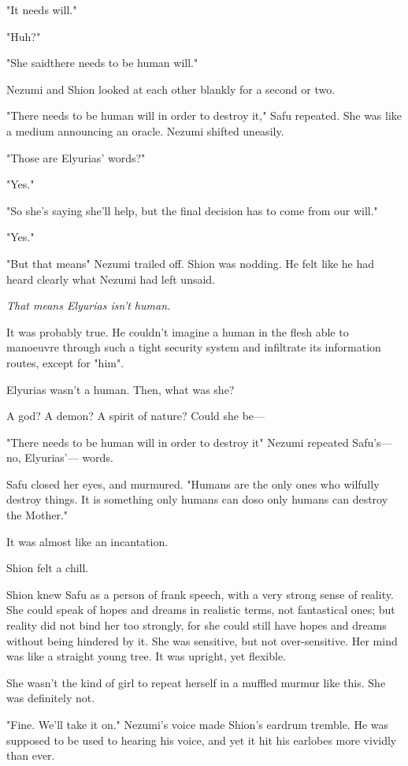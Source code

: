 "It needs will."

"Huh?"

"She said\el there needs to be human will."

Nezumi and Shion looked at each other blankly for a second or two.

"There needs to be human will in order to destroy it," Safu repeated.
She was like a medium announcing an oracle. Nezumi shifted uneasily.

"Those are Elyurias' words?"

"Yes."

"So she's saying she'll help, but the final decision has to come from
our will."

"Yes."

"But that means\el " Nezumi trailed off. Shion was nodding. He felt like
he had heard clearly what Nezumi had left unsaid.

\emph{That means Elyurias isn't human.}

It was probably true. He couldn't imagine a human in the flesh able to
manoeuvre through such a tight security system and infiltrate its
information routes, except for "him".

Elyurias wasn't a human. Then, what was she?

A god? A demon? A spirit of nature? Could she be---

"There needs to be human will in order to destroy it\el " Nezumi repeated
Safu's---no, Elyurias'--- words.

Safu closed her eyes, and murmured. "Humans are the only ones who
wilfully destroy things. It is something only humans can do\el so only
humans can destroy the Mother."

It was almost like an incantation.

Shion felt a chill.

Shion knew Safu as a person of frank speech, with a very strong sense of
reality. She could speak of hopes and dreams in realistic terms, not
fantastical ones; but reality did not bind her too strongly, for she
could still have hopes and dreams without being hindered by it. She was
sensitive, but not over-sensitive. Her mind was like a straight young
tree. It was upright, yet flexible.

She wasn't the kind of girl to repeat herself in a muffled murmur like
this. She was definitely not.

"Fine. We'll take it on." Nezumi's voice made Shion's eardrum tremble.
He was supposed to be used to hearing his voice, and yet it hit his
earlobes more vividly than ever.


